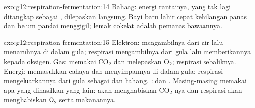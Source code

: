 \begin{solution}{exo:g12:respiration-fermentation:14}
Bahang: energi rantainya, yang tak lagi ditangkap sebagai ,
dilepaskan langsung. Bayi baru lahir cepat kehilangan panas dan belum
pandai menggigil; lemak cokelat adalah pemanas bawaannya.
\end{solution}

\begin{solution}{exo:g12:respiration-fermentation:15}
Elektron:  mengambilnya dari air lalu menaruhnya di dalam
gula; respirasi mengambilnya dari gula lalu memberikannya kepada
oksigen. Gas:  memakai $\mathrm{CO_2}$ dan melepaskan
$\mathrm{O_2}$; respirasi sebaliknya. Energi:  memasukkan
cahaya dan menyimpannya di dalam gula; respirasi mengeluarkannya dari
gula sebagai  dan bahang. :  dan .
Masing-masing memakai apa yang dihasilkan yang lain:  akan
menghabiskan $\mathrm{CO_2}$-nya dan respirasi akan menghabiskan
$\mathrm{O_2}$ serta makanannya.
\end{solution}

